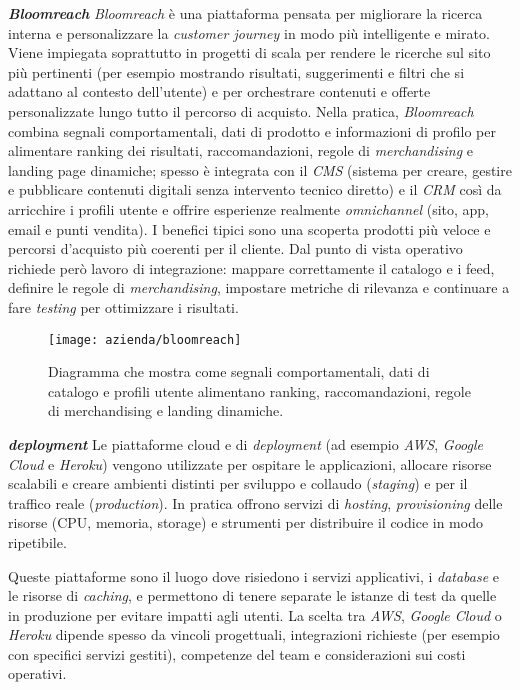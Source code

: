 \medskip
\noindent\textbf{\emph{Bloomreach}}
\emph{Bloomreach} è una piattaforma pensata per migliorare la ricerca interna e personalizzare la \emph{customer journey} in modo più intelligente e mirato. 
Viene impiegata soprattutto in progetti di scala per rendere le ricerche sul sito più pertinenti (per esempio mostrando risultati, suggerimenti e filtri che si adattano al contesto dell’utente) 
e per orchestrare contenuti e offerte personalizzate lungo tutto il percorso di acquisto.
Nella pratica, \emph{Bloomreach} combina segnali comportamentali, dati di prodotto e informazioni di profilo per alimentare ranking dei risultati, raccomandazioni, 
regole di \emph{merchandising} e landing page dinamiche; spesso è integrata con il \emph{CMS} (sistema per creare, gestire e pubblicare contenuti digitali senza intervento tecnico diretto) e il \emph{CRM} così da arricchire i profili utente e offrire esperienze 
realmente \emph{omnichannel} (sito, app, email e punti vendita).
I benefici tipici sono una scoperta prodotti più veloce e percorsi d’acquisto più coerenti per il cliente. Dal punto di vista operativo 
richiede però lavoro di integrazione: mappare correttamente il catalogo e i feed, definire le regole di \emph{merchandising}, impostare metriche di rilevanza e 
continuare a fare \emph{testing} per ottimizzare i risultati.

\begin{figure}[htbp]
    \centering
    \texttt{[image: azienda/bloomreach]}
    \caption{Diagramma che mostra come segnali comportamentali, dati di catalogo e profili utente alimentano ranking, raccomandazioni, regole di merchandising e landing dinamiche.}
    \label{fig:bloomreach}
\end{figure}

\medskip
\noindent\textbf{\emph{deployment}}
Le piattaforme cloud e di \emph{deployment} (ad esempio \emph{AWS}, \emph{Google Cloud} e \emph{Heroku}) vengono utilizzate per ospitare le applicazioni, 
allocare risorse scalabili e creare ambienti distinti per sviluppo e collaudo (\emph{staging}) e per il traffico reale (\emph{production}). 
In pratica offrono servizi di \emph{hosting}, \emph{provisioning} delle risorse (CPU, memoria, storage) e strumenti per distribuire il codice in modo ripetibile.

Queste piattaforme sono il luogo dove risiedono i servizi applicativi, i \emph{database} e le risorse di \emph{caching}, 
e permettono di tenere separate le istanze di test da quelle in produzione per evitare impatti agli utenti. La scelta tra \emph{AWS}, \emph{Google Cloud} o \emph{Heroku} 
dipende spesso da vincoli progettuali, integrazioni richieste (per esempio con specifici servizi gestiti), competenze del team e considerazioni sui costi operativi.

